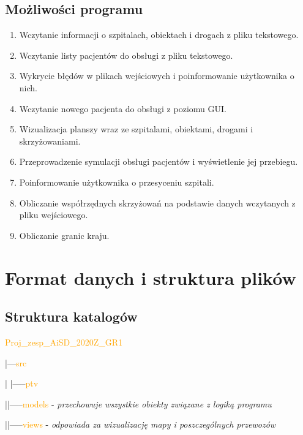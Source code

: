 \documentclass[]{article}
\begin{document}
    \subsection{Możliwości programu}
    \begin{enumerate}
        \item Wczytanie informacji o szpitalach, obiektach i drogach z pliku tekstowego.
        \item Wczytanie listy pacjentów do obsługi z pliku tekstowego.
        \item Wykrycie błędów w plikach wejściowych i poinformowanie użytkownika o nich.
        \item Wczytanie nowego pacjenta do obsługi z poziomu GUI.
        \item Wizualizacja planszy wraz ze szpitalami, obiektami, drogami i skrzyżowaniami.
        \item Przeprowadzenie symulacji obsługi pacjentów i wyświetlenie jej przebiegu.
        \item Poinformowanie użytkownika o przesyceniu szpitali.
        \item Obliczanie współrzędnych skrzyżowań na podstawie danych wczytanych z pliku wejściowego.
        \item Obliczanie granic kraju.
    \end{enumerate}
    


    \section{Format danych i struktura plików}

    \subsection{Struktura katalogów}
    \textcolor{orange}{Proj\_zesp\_AiSD\_2020Z\_GR1}

    |---\textcolor{orange}{src}

    |\hspace{4mm} |-----\textcolor{orange}{ptv}

    |\hspace{15mm}|-----\textcolor{orange}{models} - \textit{przechowuje wszystkie obiekty związane z logiką programu}

    |\hspace{15mm}|-----\textcolor{orange}{views} -\textit{ odpowiada za wizualizację mapy i poszczególnych przewozów}
\end{document}

